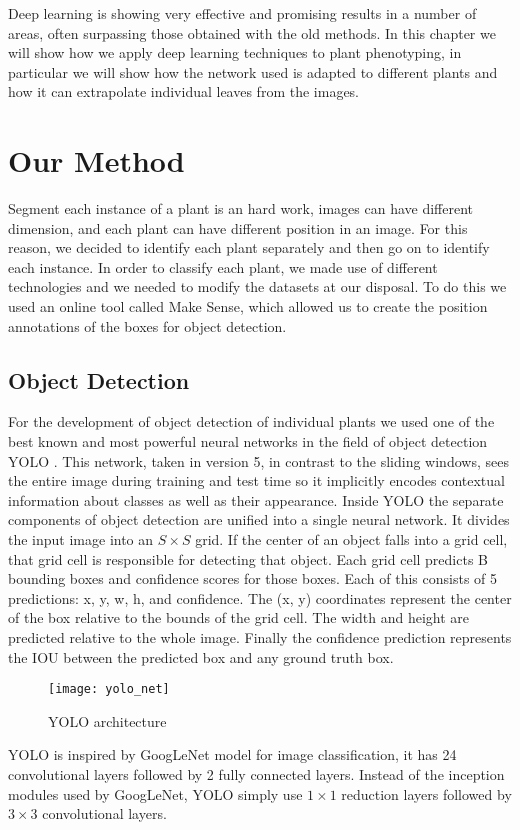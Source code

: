 



Deep learning is showing very effective and promising results in a number of areas, often surpassing those obtained with the old methods. In this chapter we will show
how we apply deep learning techniques to plant phenotyping, in particular we will show how the network used is adapted to different plants and how it can extrapolate
individual leaves from the images.

\section{Our Method}
Segment each instance of a plant is an hard work, images can have different dimension, and each plant can have different position in an image. For this reason, we decided
to identify each plant separately and then go on to identify each instance. In order to classify each plant, we made use of different technologies and we needed to modify
the datasets at our disposal. To do this we used an online tool called Make Sense, which allowed us to create the position annotations of the boxes for object detection.

\subsection{Object Detection}
For the development of object detection of individual plants we used one of the best known and most powerful neural networks in the field of object detection YOLO
\cite{redmon2016look}. This network, taken in version 5, in contrast to the sliding windows, sees the entire image during training and test time so it implicitly encodes
contextual information about classes as well as their appearance. Inside YOLO the separate components of object detection are unified into a single neural network.
It divides the input image into an $S \times S$ grid. If the center of an object falls into a grid cell, that grid cell is responsible for detecting that object.
Each grid cell predicts B bounding boxes and confidence scores for those boxes. Each of this consists of 5 predictions: x, y, w, h, and confidence. The (x, y)
coordinates represent the center of the box relative to the bounds of the grid cell. The width and height are predicted relative to the whole image. Finally
the confidence prediction represents the IOU between the predicted box and any ground truth box.
\begin{figure}[h] 
    \centering
    \texttt{[image: yolo\_net]} 
    \caption{YOLO architecture}
\end{figure}
YOLO is inspired by GoogLeNet \cite{Szegedy_2015_CVPR} model for image classification, it has 24 convolutional layers followed by 2 fully connected layers.
Instead of the inception modules used by GoogLeNet, YOLO simply use $1 \times 1$ reduction layers followed by $3 \times 3$ convolutional layers.

